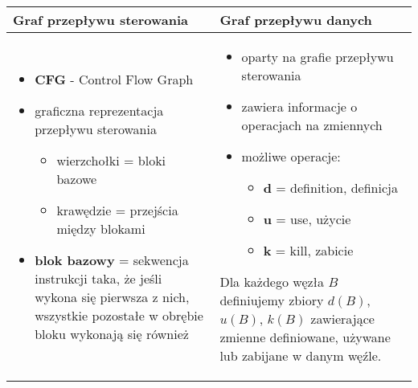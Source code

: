 \documentclass[../main.tex]{subfiles}
\begin{document}
    \begin{table}[H]
        \begin{center}
            \begin{tabular}{p{8cm} | p{8cm}}
                \textbf{Graf przepływu sterowania} &  \textbf{Graf przepływu danych}\\
                \hline
                \hline
                \begin{itemize}
                    \item \textbf{CFG} - Control Flow Graph
                    \item graficzna reprezentacja przepływu sterowania
                    \begin{itemize}
                        \item wierzchołki = bloki bazowe
                        \item krawędzie = przejścia między blokami
                    \end{itemize}
                    \item \textbf{blok bazowy} = sekwencja instrukcji taka, że jeśli wykona się
                    pierwsza z nich, wszystkie pozostałe w obrębie bloku wykonają się również
                \end{itemize}
                &
                \begin{itemize}
                    \item oparty na grafie przepływu sterowania
                    \item zawiera informacje o operacjach na zmiennych
                    \item możliwe operacje:
                    \begin{itemize}
                        \item \textbf{d} = definition, definicja
                        \item \textbf{u} = use, użycie
                        \item \textbf{k} = kill, zabicie
                    \end{itemize}
                \end{itemize}

                Dla każdego węzła $B$ definiujemy zbiory $d(B)$, $u(B)$, $k(B)$ zawierające zmienne definiowane, używane lub
                zabijane w danym węźle.
                \\
            \end{tabular}
        \end{center}
    \end{table}
\end{document}
